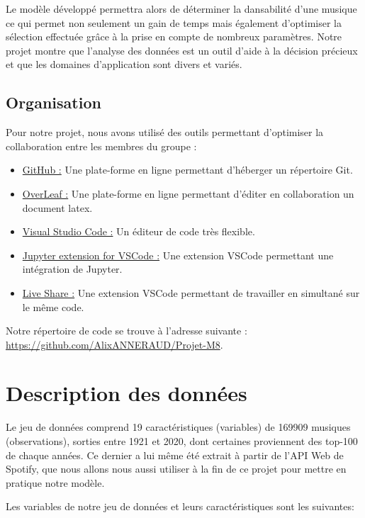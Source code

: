 \documentclass[a4paper, 12pt]{report}
\begin{document}
Le modèle développé permettra alors de déterminer la dansabilité d'une musique ce qui permet non seulement un gain de temps mais également d'optimiser la sélection effectuée grâce à la prise en compte de nombreux paramètres. Notre projet montre que l'analyse des données est un outil d'aide à la décision précieux et que les domaines d'application sont divers et variés.

\section{Organisation}

Pour notre projet, nous avons utilisé des outils permettant d'optimiser la collaboration entre les membres du groupe :
\begin{itemize}
    \item  \underline{GitHub :} Une plate-forme en ligne permettant d'héberger un répertoire Git.
    \item \underline{OverLeaf :} Une plate-forme en ligne permettant d'éditer en collaboration un document latex.
    \item \underline{Visual Studio Code :} Un éditeur de code très flexible.
    \item \underline{Jupyter extension for VSCode :} Une extension VSCode permettant une intégration de Jupyter.
    \item \underline{Live Share :} Une extension VSCode permettant de travailler en simultané sur le même code.
\end{itemize}

Notre répertoire de code se trouve à l'adresse suivante : \url{https://github.com/AlixANNERAUD/Projet-M8}.


\chapter{Description des données}

Le jeu de données\cite{Jeu_De_Donnees} comprend 19 caractéristiques (variables) de 169909 musiques (observations), sorties entre 1921 et 2020, dont certaines proviennent des top-100 de chaque années. Ce dernier a lui même été extrait à partir de l'API Web de Spotify\cite{Spotify_for_Developers_API}, que nous allons nous aussi utiliser à la fin de ce projet pour mettre en pratique notre modèle.

Les variables de notre jeu de données et leurs caractéristiques sont les suivantes: 
\end{document}
